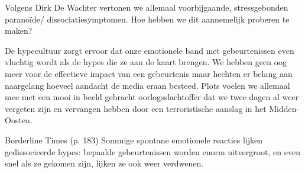 \documentclass[main.tex]{subfiles}
\begin{document}
\begin{examenvraag}
    \begin{vraag}
        Volgens Dirk De Wachter vertonen we allemaal voorbijgaande, stressgebonden paranoïde/ dissociatiesymptomen. Hoe hebben we dit aannemelijk proberen te maken?
    \end{vraag}

    \begin{antwoord}
        De hypecultuur zorgt ervoor dat onze emotionele band met 
        gebeurtenissen even vluchtig wordt als de hypes die ze aan de kaart 
        brengen.
        We hebben geen oog meer voor de effectieve impact van een gebeurtenis 
        maar hechten er belang aan naargelang hoeveel aandacht de media eraan 
        besteed.‭ ‬Plots voelen we allemaal mee met een mooi in beeld gebracht 
        oorlogsslachtoffer dat we twee dagen al weer vergeten zijn en 
        vervangen hebben door een terroristische aanslag in het Midden-
        Oosten.
        \begin{citaat}{Borderline Times (p. 183)}
            Sommige spontane emotionele reacties lijken gedissocieerde hypes: bepaalde gebeurtenissen worden enorm uitvergroot, en even snel als ze gekomen zijn, lijken ze ook weer verdwenen.
        \end{citaat}
    \end{antwoord}
\end{examenvraag}
\end{document}
